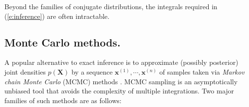 \documentclass[]{article}
\newcommand{\bvec}[1]{\textbf{#1}}
\newcommand{\pr}{p}
\newcommand{\dd}{\;\mathrm{d}} %
\begin{document}
Beyond the families of conjugate distributions, the integrals required in 
(\ref{e:inference}) 
are often intractable. 


\subsection{Monte Carlo methods.}
A popular alternative to exact inference is to approximate (possibly posterior) joint densities $\pr(\bvec{X})$ 
by a sequence $\bvec{x}^{(1)}, \cdots, \bvec{x}^{(n)}$ of samples taken
 via \emph{Markov chain Monte Carlo} (MCMC) methods \citep{koller2009probabilistic}.  
MCMC sampling is an asymptotically unbiased tool that avoids the complexity of multiple integrations. %
Two major families of such methods are as follows:

\end{document}
